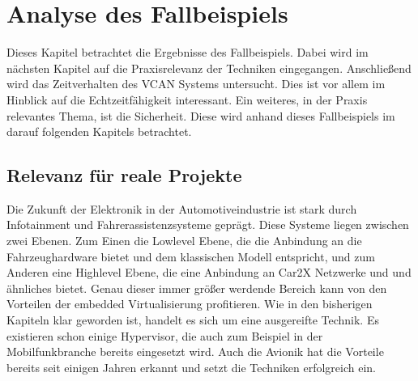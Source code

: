 \documentclass[
  a4paper,					    %
  twoside,
  DIV=calc,     				%
  bibliography=totoc,
  cleardoublepage=empty,
  ngerman,     					%
  final       					%
]{scrbook}
\begin{document}
\chapter{Analyse des Fallbeispiels}
\label{sec:Beispiel_Analyse}
Dieses Kapitel betrachtet die Ergebnisse des Fallbeispiels. Dabei wird im nächsten Kapitel auf die Praxisrelevanz der Techniken eingegangen. Anschließend wird das Zeitverhalten des VCAN Systems untersucht. Dies ist vor allem im Hinblick auf die Echtzeitfähigkeit interessant. Ein weiteres, in der Praxis relevantes Thema, ist die Sicherheit. Diese wird anhand dieses Fallbeispiels im darauf folgenden Kapitels betrachtet.



\section{Relevanz für reale Projekte}
\label{sec:Relevanz}
Die Zukunft der Elektronik in der Automotiveindustrie ist stark durch Infotainment und Fahrerassistenzsysteme geprägt. Diese Systeme liegen zwischen zwei Ebenen. Zum Einen die Lowlevel Ebene, die die Anbindung an die Fahrzeughardware bietet und dem klassischen Modell entspricht, und zum Anderen eine Highlevel Ebene, die eine Anbindung an Car2X Netzwerke und und ähnliches bietet. Genau dieser immer größer werdende Bereich kann von den Vorteilen der embedded Virtualisierung profitieren. Wie in den bisherigen Kapiteln klar geworden ist, handelt es sich um eine ausgereifte Technik. Es existieren schon einige Hypervisor, die auch zum Beispiel in der Mobilfunkbranche bereits eingesetzt wird. Auch die Avionik hat die Vorteile bereits seit einigen Jahren erkannt und setzt die Techniken erfolgreich ein.
\end{document}
